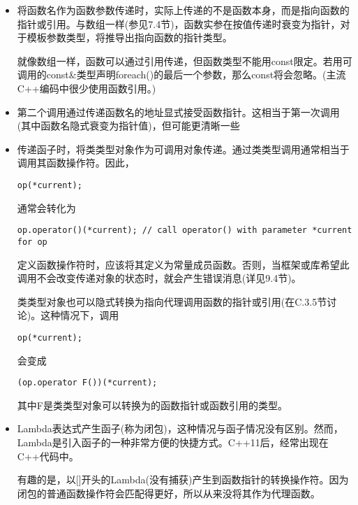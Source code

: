 \begin{itemize}
\item
将函数名作为函数参数传递时，实际上传递的不是函数本身，而是指向函数的指针或引用。与数组一样(参见7.4节)，函数实参在按值传递时衰变为指针，对于模板参数类型，将推导出指向函数的指针类型。

就像数组一样，函数可以通过引用传递，但函数类型不能用const限定。若用可调用的const\&类型声明foreach()的最后一个参数，那么const将会忽略。(主流C++编码中很少使用函数引用。)

\item
第二个调用通过传递函数名的地址显式接受函数指针。这相当于第一次调用(其中函数名隐式衰变为指针值)，但可能更清晰一些

\item
传递函子时，将类类型对象作为可调用对象传递。通过类类型调用通常相当于调用其函数操作符。因此，

\begin{lstlisting}[style=styleCXX]
op(*current);
\end{lstlisting}

通常会转化为

\begin{lstlisting}[style=styleCXX]
op.operator()(*current); // call operator() with parameter *current for op
\end{lstlisting}

定义函数操作符时，应该将其定义为常量成员函数。否则，当框架或库希望此调用不会改变传递对象的状态时，就会产生错误消息(详见9.4节)。

类类型对象也可以隐式转换为指向代理调用函数的指针或引用(在C.3.5节讨论)。这种情况下，调用

\begin{lstlisting}[style=styleCXX]
op(*current);
\end{lstlisting}

会变成

\begin{lstlisting}[style=styleCXX]
(op.operator F())(*current);
\end{lstlisting}

其中F是类类型对象可以转换为的函数指针或函数引用的类型。

\item
Lambda表达式产生函子(称为闭包)，这种情况与函子情况没有区别。然而，Lambda是引入函子的一种非常方便的快捷方式。C++11后，经常出现在C++代码中。

有趣的是，以[]开头的Lambda(没有捕获)产生到函数指针的转换操作符。因为闭包的普通函数操作符会匹配得更好，所以从来没将其作为代理函数。
\end{itemize}

